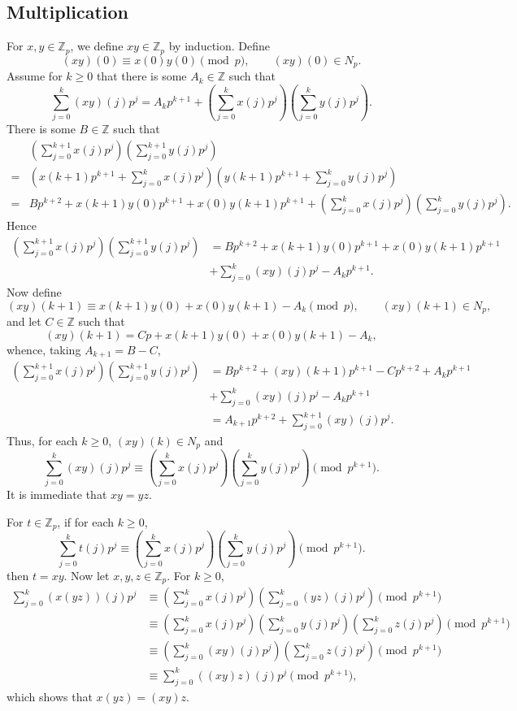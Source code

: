 \documentclass{article}
\theoremstyle{definition}
\theoremstyle{definition}
\begin{document}
\subsection{Multiplication}
For $x,y \in \mathbb{Z}_p$, we define $xy \in \mathbb{Z}_p$ by induction.
Define
\[
(xy)(0) \equiv x(0) y(0) \pmod{p},\qquad (xy)(0) \in N_p.
\]
Assume for $k \geq 0$ that there is some $A_k \in \mathbb{Z}$ such that 
\[
\sum_{j=0}^k (xy)(j) p^j = A_k p^{k+1} +\left( \sum_{j=0}^k x(j) p^j \right) \left( \sum_{j=0}^k y(j) p^j\right).
\]
There is some $B \in \mathbb{Z}$ such that 
\[
\begin{split}
&\left( \sum_{j=0}^{k+1} x(j) p^j \right) \left( \sum_{j=0}^{k+1} y(j) p^j\right)\\
=&\left( x(k+1) p^{k+1} + \sum_{j=0}^k x(j) p^j \right) \left( y(k+1) p^{k+1} + \sum_{j=0}^k y(j) p^j\right)\\
=&B p^{k+2} + x(k+1)y(0) p^{k+1} + x(0)y(k+1)p^{k+1} + \left( \sum_{j=0}^k x(j) p^j \right) \left( \sum_{j=0}^k y(j) p^j\right).
\end{split}
\]
Hence
\begin{align*}
\left( \sum_{j=0}^{k+1} x(j) p^j \right) \left( \sum_{j=0}^{k+1} y(j) p^j\right)&=B p^{k+2} + x(k+1)y(0) p^{k+1} + x(0)y(k+1)p^{k+1}\\
&+\sum_{j=0}^k (xy)(j) p^j - A_k p^{k+1}.
\end{align*}
Now define
\[
(xy)(k+1) \equiv x(k+1)y(0) + x(0)y(k+1) - A_k \pmod{p},\qquad (xy)(k+1) \in N_p,
\]
and let $C \in \mathbb{Z}$ such that
\[
(xy)(k+1) = Cp + x(k+1)y(0) + x(0)y(k+1) - A_k,
\]
whence, taking $A_{k+1} = B-C$,
\begin{align*}
\left( \sum_{j=0}^{k+1} x(j) p^j \right) \left( \sum_{j=0}^{k+1} y(j) p^j\right)&=Bp^{k+2} + 
(xy)(k+1)p^{k+1} - Cp^{k+2} + A_kp^{k+1}\\
&+\sum_{j=0}^k (xy)(j) p^j - A_k p^{k+1}\\
&=A_{k+1}p^{k+2} + \sum_{j=0}^{k+1} (xy)(j) p^j.
\end{align*}
Thus, for each $k \geq 0$, $(xy)(k) \in N_p$ and 
\begin{equation}
\sum_{j=0}^k (xy)(j) p^j \equiv \left( \sum_{j=0}^k x(j) p^j \right) \left( \sum_{j=0}^k y(j) p^j\right) \pmod{p^{k+1}}.
\label{multiplication}
\end{equation}
It is immediate that $xy=yz$. 

For $t \in \mathbb{Z}_p$, if for each $k \geq 0$,
\[
\sum_{j=0}^k t(j) p^j \equiv \left( \sum_{j=0}^k x(j) p^j \right) \left( \sum_{j=0}^k y(j) p^j\right) \pmod{p^{k+1}}.
\]
then $t=xy$. Now let $x,y,z \in \mathbb{Z}_p$. For $k \geq 0$,
\begin{align*}
\sum_{j=0}^k (x(yz))(j) p^j &\equiv\left( \sum_{j=0}^k x(j) p^j \right) \left( \sum_{j=0}^k (yz)(j) p^j\right) \pmod{p^{k+1}}\\
&\equiv \left( \sum_{j=0}^k x(j) p^j \right)  \left( \sum_{j=0}^k y(j) p^j \right) \left( \sum_{j=0}^k z(j) p^j\right) \pmod{p^{k+1}}\\
&\equiv \left( \sum_{j=0}^k (xy)(j) p^j\right) \left( \sum_{j=0}^k z(j) p^j \right) \pmod{p^{k+1}}\\
&\equiv  \sum_{j=0}^k ((xy)z)(j) p^j \pmod{p^{k+1}},
\end{align*}
which shows that $x(yz)=(xy)z$. 
\end{document}
